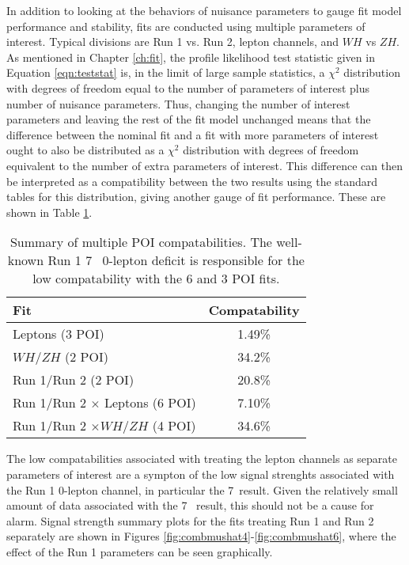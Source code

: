 In addition to looking at the behaviors of nuisance parameters to gauge fit model performance and stability, fits are conducted using multiple parameters of interest.  Typical divisions are Run 1 vs. Run 2, lepton channels, and $WH$ vs $ZH$.  As mentioned in Chapter \ref{ch:fit}, the profile likelihood test statistic given in Equation \ref{eqn:teststat} is, in the limit of large sample statistics, a $\chi^2$ distribution with degrees of freedom equal to the number of parameters of interest plus number of nuisance parameters.  Thus, changing the number of interest parameters and leaving the rest of the fit model unchanged means that the difference between the nominal fit and a fit with more parameters of interest ought to also be distributed as a $\chi^2$ distribution with degrees of freedom equivalent to the number of extra parameters of interest.  This difference can then be interpreted as a compatibility between the two results using the standard tables for this distribution, giving another gauge of fit performance.  These are shown in Table \ref{tab:compatability}.

\begin{table}[!htbp]\captionsetup{justification=centering}
\begin{center}\begin{tabular}{|l|c|}
\hline
Fit & Compatability \\\hline
Leptons (3 POI) & 1.49\% \\
$WH/ZH$ (2 POI) & 34.2\% \\
Run 1/Run 2 (2 POI) & 20.8\% \\
Run 1/Run 2 $\times$ Leptons (6 POI) & 7.10\% \\
Run 1/Run 2 $\times WH/ZH$  (4 POI) & 34.6\% \\
\hline
\end{tabular}
\caption{Summary of multiple POI compatabilities.  The well-known Run 1 7 \tev\, 0-lepton deficit is responsible for the low compatability with the 6 and 3 POI fits.}
\label{tab:compatability}
\end{center}
\end{table}

The low compatabilities associated with treating the lepton channels as separate parameters of interest are a sympton of the low signal strenghts associated with the Run 1 0-lepton channel, in particular the 7 \tev\,result.  Given the relatively small amount of data associated with the 7 \tev\, result, this should not be a cause for alarm.  Signal strength summary plots for the fits treating Run 1 and Run 2 separately are shown in Figures \ref{fig:combmushat4}-\ref{fig:combmushat6}, where the effect of the Run 1 parameters can be seen graphically.

